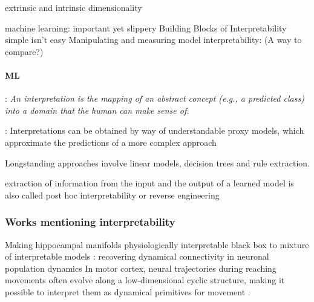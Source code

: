 \documentclass{article}
\newcommand{\ascomment}[1]{\textcolor{ascolor}{(#1)}}
\theoremstyle{definition} \newtheorem{definition}{Definition}  \newtheorem{example}{Example}
\theoremstyle{remark} \newtheorem{remark}{Remark}
\newcounter{ct}
\begin{document}
\citep{whiteway2019interpretable}
\citep{kar2022interpretability}
extrinsic and intrinsic dimensionality\citep{jazayeri2021interpreting}

 machine learning: important yet slippery\citep{lipton2018mythos}	
 Building Blocks of Interpretability \citep{olah2018interpretability}
\citep{beisbart2022interpretability}
simple isn't easy \citep{raz2024ml}
Manipulating and measuring model interpretability\citep{poursabzi2021manipulating}: \ascomment{A way to compare?}
\citep{he2024multilevel}

\paragraph{ML}
\citep{montavon2018methods}: \emph{An interpretation is the mapping of an abstract concept (e.g., a predicted class) into a domain that the human can make sense of.}

\citep{ehrhardt2017learning, guidotti2018survey}: Interpretations can be obtained by way of understandable proxy models, which approximate the predictions of a more complex approach

Longstanding approaches involve linear models, decision trees and rule extraction.

extraction of information from the input and the output of a learned model is also called post hoc interpretability or reverse engineering

\subsubsection{Works mentioning interpretability}
\citep{whiteway2019interpretable}
\citep{kar2022interpretability}
 Making hippocampal manifolds physiologically interpretable \citep{esparza2023interpretable}
black box to mixture of interpretable models \citep{ghosh2023blackbox}
\citep{schneider2023learnable}
\citep{brenner2024almost}
\citep{menier2025interpretable}
\citep{nonnenmacher2017extracting}
\citep{zhang2025netformer}: recovering dynamical connectivity in neuronal population dynamics
\citep{klindt2023identifying,klindt2025superposition}
In motor cortex, neural trajectories during reaching movements often evolve along a low-dimensional cyclic structure, making it possible to interpret them as dynamical primitives for movement \citep{ijspeert2013dynamical}.
%
\citep{marton2021efficient}
\end{document}
